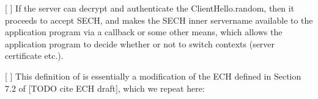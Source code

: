 [ ] If the server can decrypt and authenticate the ClientHello.random, then it proceeds to accept SECH, and makes the SECH inner servername available to the application program via a callback or some other means, which allows the application program to decide whether or not to switch contexts (server certificate etc.).


[ ] This definition of  is essentially a modification of the ECH  defined in Section 7.2 of [TODO cite ECH draft], which we repeat here:

